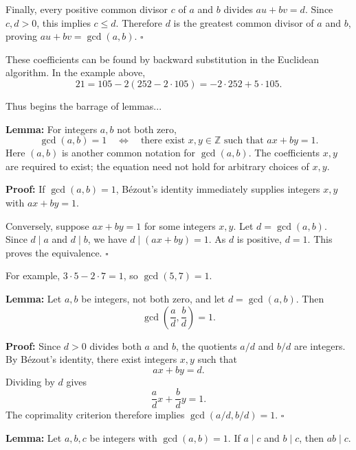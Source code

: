 \documentclass[a4paper,11pt,abstracton]{scrartcl}
\theoremstyle{dotlessP}
\theoremstyle{dotlessS}
\theoremstyle{remark}
\theoremstyle{definition}
\begin{document}
Finally, every positive common divisor $c$ of $a$ and $b$ divides
$au+bv=d$. Since $c,d>0$, this implies $c\leq d$.
Therefore $d$ is the greatest common divisor of $a$ and $b$, proving
$au+bv=\gcd(a,b)$.
\hfill$\square$



\begin{example_box}
These coefficients can be found by backward substitution in the Euclidean
algorithm. In the example above,
\[
    21=105-2(252-2\cdot105)=-2\cdot252+5\cdot105.
\]
\end{example_box}

Thus begins the barrage of lemmas...

\begin{remark_box}
\textbf{Lemma:}
For integers $a,b$ not both zero,
\[
    \gcd(a,b)=1
    \quad\Longleftrightarrow\quad
    \text{there exist }x,y\in\mathbb{Z}\text{ such that }ax+by=1.
\]
Here $(a,b)$ is another common notation for $\gcd(a,b)$.
The coefficients $x,y$ are required to exist; the equation need not
hold for arbitrary choices of $x,y$.
\end{remark_box}

\textbf{Proof:}
If $\gcd(a,b)=1$, B\'ezout's identity immediately supplies integers
$x,y$ with $ax+by=1$.

Conversely, suppose $ax+by=1$ for some integers $x,y$. Let
$d=\gcd(a,b)$. Since $d\mid a$ and $d\mid b$, we have
$d\mid(ax+by)=1$. As $d$ is positive, $d=1$.
This proves the equivalence.
\hfill$\square$



\begin{example_box}
For example, $3\cdot5-2\cdot7=1$, so $\gcd(5,7)=1$.
\end{example_box}


\begin{remark_box}
\textbf{Lemma:}
Let $a,b$ be integers, not both zero, and let $d=\gcd(a,b)$. Then
\[
    \gcd\!\left(\frac{a}{d},\frac{b}{d}\right)=1.
\]
\end{remark_box}

\textbf{Proof:}
Since $d>0$ divides both $a$ and $b$, the quotients $a/d$ and $b/d$
are integers. By B\'ezout's identity, there exist integers $x,y$ such that
\[
    ax+by=d.
\]
Dividing by $d$ gives
\[
    \frac{a}{d}x+\frac{b}{d}y=1.
\]
The coprimality criterion therefore implies
$\gcd(a/d,b/d)=1$.
\hfill$\square$


\begin{remark_box}
\textbf{Lemma:}
Let $a,b,c$ be integers with $\gcd(a,b)=1$. If $a\mid c$ and
$b\mid c$, then $ab\mid c$.
\end{remark_box}
\end{document}
